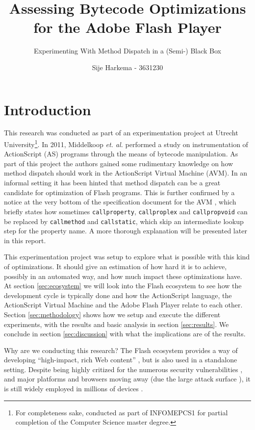 \documentclass[a4paper,11pt]{scrartcl}
\title{Assessing Bytecode Optimizations for the Adobe Flash Player}
\subtitle{Experimenting With Method Dispatch in a (Semi-) Black Box}
\author{Sije Harkema - 3631230}
\begin{document}
\maketitle

\section{Introduction}
\label{sec:introduction}

This research was conducted as part of an experimentation project at Utrecht University\footnote{For completeness sake, conducted as part of INFOMEPCS1 for partial completion of the Computer Science master degree.}. In 2011, Middelkoop \textit{et. al.} \cite{Middelkoop2011} performed a study on instrumentation of ActionScript (AS) programs through the means of bytecode manipulation. As part of this project the authors gained some rudimentary knowledge on how method dispatch should work in the ActionScript Virtual Machine (AVM). In an informal setting it has been hinted that method dispatch can be a great candidate for optimization of Flash programs. This is further confirmed by a notice at the very bottom of the specification document for the AVM \cite{Adobe2007}, which briefly states how sometimes \texttt{callproperty}, \texttt{callproplex} and \texttt{callpropvoid} can be replaced by \texttt{callmethod} and \texttt{callstatic}, which skip an intermediate lookup step for the property name. A more thorough explanation will be presented later in this report.

This experimentation project was setup to explore what is possible with this kind of optimizations. It should give an estimation of how hard it is to achieve, possibly in an automated way, and how much impact these optimizations have. At section \ref{sec:ecosystem} we will look into the Flash ecosystem to see how the development cycle is typically done and how the ActionScript language, the ActionScript Virtual Machine and the Adobe Flash Player relate to each other. Section \ref{sec:methodology} shows how we setup and execute the different experiments, with the results and basic analysis in section \ref{sec:results}. We conclude in section \ref{sec:discussion} with what the implications are of the results.

Why are we conducting this research? The Flash ecosystem provides a way of developing ``high-impact, rich Web content'' \cite{AdobeSystems}, but is also used in a standalone setting. Despite being highly critized for the numerous security vulnerabilities \cite{Van-Acker2012, Symantec2016}, and major platforms and browsers moving away (due the large attack surface \cite{LaForge2016, Seitz2009}), it is still widely employed in millions of devices \cite{AdobeSystemsa}.
\end{document}
